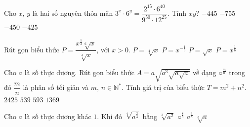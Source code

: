 \begin{ex}%
	Cho $x$, $y$ là hai số nguyên  thỏa mãn $3^x\cdot6^y
	=\dfrac{2^{15}\cdot6^{40}}{9^{50}\cdot12^{25}}$. Tính  $x y$?
	 \choice
		{$-445$} 
		{$-755$} 
		{\True  $-450$}
		{$-425$} 
\end{ex}

\begin{ex}%
	Rút gọn biểu thức  $P=\dfrac{x^{\tfrac{1}{3}}\sqrt[6]{x}}{\sqrt[4]{x}}$, với $x>0$.
	\choice 
		{\True  $P=\sqrt[4]{x}$}
		{$P=x^{-\tfrac{1}{6}}$} 
		{$P=\sqrt{x}$} 
		 {$P=x^{\tfrac{1}{6}}$}
\end{ex}

\begin{ex}%
	Cho $a$ là số thực dương. Rút gọn biểu thức  $A=a\sqrt{a^{3}\sqrt{a\sqrt{a}}}$ về dạng $a^{\tfrac{m}{n}}$ trong đó $\dfrac{m}{n}$ là phân số tối giản và $m$, $n\in\mathbb{N}^{*}$. Tính giá trị của biểu thức $T=m^2+n^2$.
	\choice 
		{$2425$} 
		 {$539$}
		 {\True $593$}
		{$1369$} 
\end{ex}

\begin{ex}%
	Cho $a$ là  số thực dương khác $1$. Khi đó $\sqrt[4]{a^{\tfrac{2}{3}}}
	$ bằng 
	\choice 
		 {$\sqrt[3]{a^2}$}
		{$a^{\tfrac{8}{3}}$} 
		 {$a^{\tfrac{3}{8}}$}
		{\True  $\sqrt[6]a$}
\end{ex}

